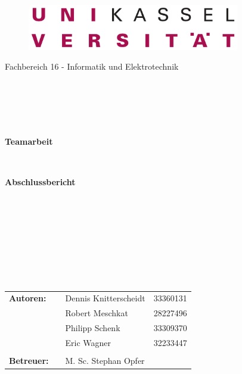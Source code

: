 \documentclass[a4paper,12pt,headsepline]{scrartcl}
\begin{document}
	\thispagestyle{empty}
	
	\begin{verbatim}
	
	
	\end{verbatim}
	
	\begin{center}
		\begin{figure} [H]
			\centering
			\includegraphics[height=2cm]{Images/Logo_Uni-Kassel.png}
		\end{figure}
		\Large{Fachbereich 16 - Informatik und Elektrotechnik}\\
	\end{center}
	
	
	\begin{verbatim}
	
	
	
	
	\end{verbatim}
	\begin{center}
		\doublespacing
		\textbf{\LARGE{Teamarbeit}}\\
		\singlespacing
		\begin{verbatim}
		
		\end{verbatim}
		\textbf{Abschlussbericht}
	\end{center}
	\begin{verbatim}
	
	\end{verbatim}
	\begin{center}
		
	\end{center}
	\begin{verbatim}
	
	\end{verbatim}
	\begin{center}
		
	\end{center}
	\begin{verbatim}
	
	
	
	
	\end{verbatim}
	\begin{flushleft}
		\begin{tabular}{llll}
			\textbf{Autoren:} & & Dennis Knitterscheidt & 33360131 \\
			& & Robert Meschkat & 28227496\\
			& & Philipp Schenk & 33309370\\
			& & Eric Wagner & 32233447\\ \\
			\textbf{Betreuer:} & & M. Sc. Stephan Opfer &\\
		\end{tabular}
	\end{flushleft}
	\newpage
	\thispagestyle{empty}
	\tableofcontents
	\newpage
	
\end{document}
